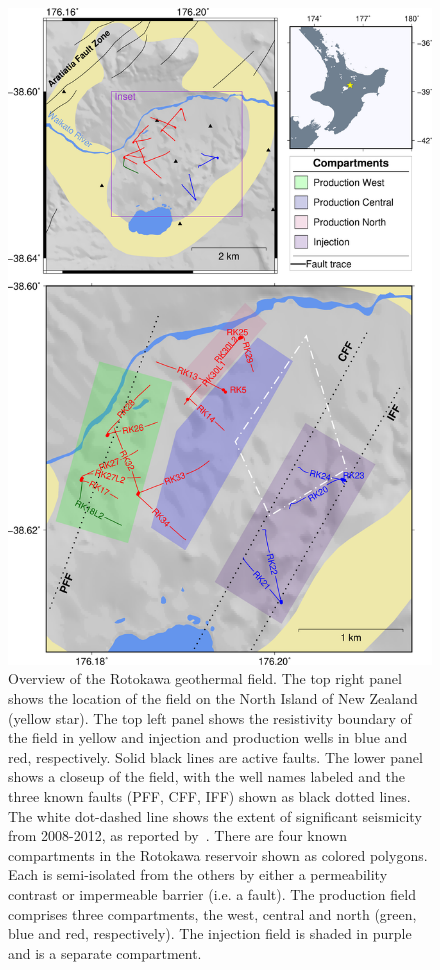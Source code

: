 \begin{figure}[h!]
\begin{center}
\includegraphics[width=0.70\columnwidth]{Chapter_4_Rot/figures/merc_Rot_overview_inset/merc_Rot_overview_struct_inset_NI_compartments_original}
\caption{{Overview of the Rotokawa geothermal field. The top right panel shows the
location of the field on the North Island of New Zealand (yellow star).
The top left panel shows the resistivity boundary of the field in yellow
and injection and production wells in blue and red, respectively. Solid
black lines are active faults. The lower panel shows a closeup of the
field, with the well names labeled and the three known faults (PFF, CFF,
IFF) shown as black dotted lines. The white dot-dashed line shows the
extent of significant seismicity from 2008-2012, as reported
by~\protect\citet{Sherburn_2015}. There are four known compartments in the Rotokawa
reservoir shown as colored polygons. Each is semi-isolated from the
others by either a permeability contrast or impermeable barrier (i.e. a
fault). The production field comprises three compartments, the west,
central and north (green, blue and red, respectively). The injection
field is shaded in purple and is a separate compartment.
{\label{518273}}%
}}
\end{center}
\end{figure}

